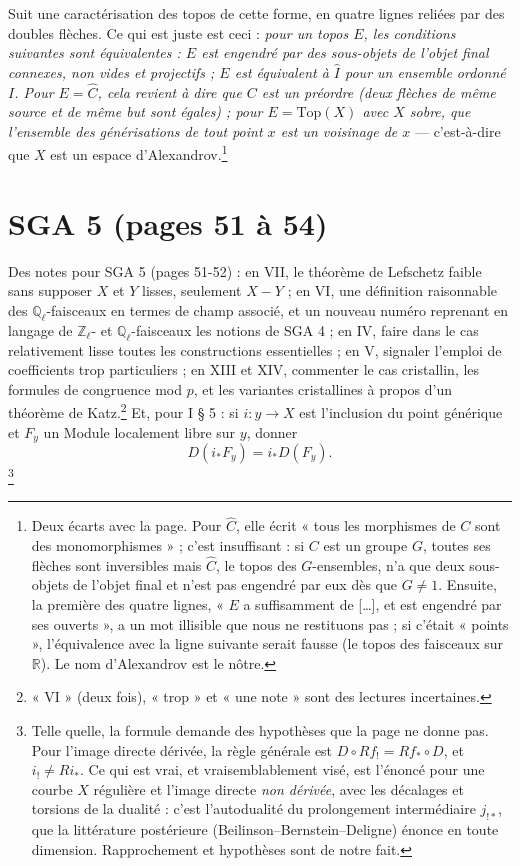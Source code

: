 \documentclass[11pt,a4paper]{article}
\begin{document}
Suit une caractérisation des topos de cette forme, en quatre lignes reliées
par des doubles flèches. Ce qui est juste est ceci : \emph{pour un topos $E$,
les conditions suivantes sont équivalentes : $E$ est engendré par des
sous-objets de l'objet final connexes, non vides et projectifs ; $E$ est
équivalent à $\widehat{I}$ pour un ensemble ordonné $I$. Pour $E =
\widehat{C}$, cela revient à dire que $C$ est un préordre (deux flèches de
même source et de même but sont égales) ; pour $E = \mathrm{Top}(X)$ avec $X$
sobre, que l'ensemble des générisations de tout point $x$ est un voisinage de
$x$} --- c'est-à-dire que $X$ est un espace d'Alexandrov.\footnote{Deux
écarts avec la page. Pour $\widehat{C}$, elle écrit « tous les morphismes de
$C$ sont des monomorphismes » ; c'est insuffisant : si $C$ est un groupe $G$,
toutes ses flèches sont inversibles mais $\widehat{C}$, le topos des
$G$-ensembles, n'a que deux sous-objets de l'objet final et n'est pas engendré
par eux dès que $G \neq 1$. Ensuite, la première des quatre lignes, « $E$ a
suffisamment de [\ldots], et est engendré par ses ouverts », a un mot
illisible que nous ne restituons pas ; si c'était « points », l'équivalence
avec la ligne suivante serait fausse (le topos des faisceaux sur
$\mathbb{R}$). Le nom d'Alexandrov est le nôtre.}

\section*{SGA 5 (pages 51 à 54)}

Des notes pour SGA 5 (pages 51-52) : en VII, le théorème de Lefschetz faible
sans supposer $X$ et $Y$ lisses, seulement $X - Y$ ; en VI, une définition
raisonnable des $\mathbb{Q}_\ell$-faisceaux en termes de champ associé, et un
nouveau numéro reprenant en langage de $\mathbb{Z}_\ell$- et
$\mathbb{Q}_\ell$-faisceaux les notions de SGA 4 ; en IV, faire dans le cas
relativement lisse toutes les constructions essentielles ; en V, signaler
l'emploi de coefficients trop particuliers ; en XIII et XIV, commenter le cas
cristallin, les formules de congruence mod $p$, et les variantes
cristallines à propos d'un théorème de Katz.\footnote{« VI » (deux fois),
« trop » et « une note » sont des lectures incertaines.}
Et, pour I § 5 : si $i : y \to X$ est l'inclusion du point générique et $F_y$
un Module localement libre sur $y$, donner
\[
D(i_{*}F_y) = i_{*}D(F_y) .
\]
\footnote{Telle quelle, la formule demande des hypothèses que la page ne donne
pas. Pour l'image directe dérivée, la règle générale est
$D \circ Rf_{!} = Rf_{*} \circ D$, et $i_{!} \neq Ri_{*}$. Ce qui est vrai,
et vraisemblablement visé, est l'énoncé pour une courbe $X$ régulière et
l'image directe \emph{non dérivée}, avec les décalages et torsions de la
dualité : c'est l'autodualité du prolongement intermédiaire $j_{!*}$, que
la littérature postérieure (Beilinson--Bernstein--Deligne) énonce en toute
dimension. Rapprochement et hypothèses sont de notre fait.}
\end{document}
